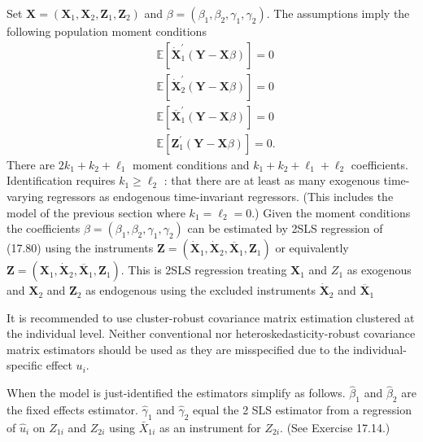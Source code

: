 \documentclass[10pt]{article}
\begin{document}
Set $\boldsymbol{X}=\left(\boldsymbol{X}_{1}, \boldsymbol{X}_{2}, \boldsymbol{Z}_{1}, \boldsymbol{Z}_{2}\right)$ and $\beta=\left(\beta_{1}, \beta_{2}, \gamma_{1}, \gamma_{2}\right)$. The assumptions imply the following population moment conditions
$$
\begin{aligned}
&\mathbb{E}\left[\dot{\boldsymbol{X}}_{1}^{\prime}(\boldsymbol{Y}-\boldsymbol{X} \beta)\right]=0 \\
&\mathbb{E}\left[\dot{\boldsymbol{X}}_{2}^{\prime}(\boldsymbol{Y}-\boldsymbol{X} \beta)\right]=0 \\
&\mathbb{E}\left[\overline{\boldsymbol{X}}_{1}^{\prime}(\boldsymbol{Y}-\boldsymbol{X} \beta)\right]=0 \\
&\mathbb{E}\left[\boldsymbol{Z}_{1}^{\prime}(\boldsymbol{Y}-\boldsymbol{X} \beta)\right]=0 .
\end{aligned}
$$
There are $2 k_{1}+k_{2}+\ell_{1}$ moment conditions and $k_{1}+k_{2}+\ell_{1}+\ell_{2}$ coefficients. Identification requires $k_{1} \geq \ell_{2}$ : that there are at least as many exogenous time-varying regressors as endogenous time-invariant regressors. (This includes the model of the previous section where $k_{1}=\ell_{2}=0$.) Given the moment conditions the coefficients $\beta=\left(\beta_{1}, \beta_{2}, \gamma_{1}, \gamma_{2}\right)$ can be estimated by 2SLS regression of (17.80) using the instruments $\boldsymbol{Z}=\left(\dot{\boldsymbol{X}}_{1}, \dot{\boldsymbol{X}}_{2}, \overline{\boldsymbol{X}}_{1}, \boldsymbol{Z}_{1}\right)$ or equivalently $\boldsymbol{Z}=\left(\boldsymbol{X}_{1}, \dot{\boldsymbol{X}}_{2}, \overline{\boldsymbol{X}}_{1}, \boldsymbol{Z}_{1}\right)$. This is 2SLS regression treating $\boldsymbol{X}_{1}$ and $Z_{1}$ as exogenous and $\boldsymbol{X}_{2}$ and $\boldsymbol{Z}_{2}$ as endogenous using the excluded instruments $\dot{\boldsymbol{X}}_{2}$ and $\overline{\boldsymbol{X}}_{1}$

It is recommended to use cluster-robust covariance matrix estimation clustered at the individual level. Neither conventional nor heteroskedasticity-robust covariance matrix estimators should be used as they are misspecified due to the individual-specific effect $u_{i}$.

When the model is just-identified the estimators simplify as follows. $\widehat{\beta}_{1}$ and $\widehat{\beta}_{2}$ are the fixed effects estimator. $\widehat{\gamma}_{1}$ and $\widehat{\gamma}_{2}$ equal the 2 SLS estimator from a regression of $\widehat{u}_{i}$ on $Z_{1 i}$ and $Z_{2 i}$ using $\bar{X}_{1 i}$ as an instrument for $Z_{2 i}$. (See Exercise 17.14.)
\end{document}
